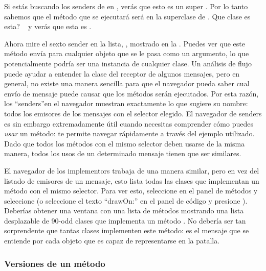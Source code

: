 \documentclass[spanish,a4paper,10pt,twoside]{book}
\begin{document}
Si est\'as buscando los senders de  en , ver\'as que esto es un super .  Por lo tanto sabemos que el m\'etodo que se ejecutar\'a ser\'a en la superclase de  . Que clase es esta?  \Actclick ~  y ver\'as que esta es .

Ahora mire el sexto sender en la lista,  , mostrado en la .
Puedes ver que este m\'etodo env\'ia para cualquier objeto que se le pasa como un argumento, lo que potencialmente podr\'ia ser una instancia de cualquier clase.
Un an\'alisis de flujo puede ayudar a entender la clase del receptor de algunos
mensajes, pero en general, no existe una manera sencilla para que el navegador
pueda saber cual env\'io de mensaje puede causar que los m\'etodos ser\'an
ejecutados. Por esta raz\'on, los ``senders''en el navegador muestran exactamente lo que sugiere su nombre: todos los emisores de los mensajes con el selector elegido. El navegador de senders es sin embargo extremadamente \'util cuando necesitas comprender c\'omo puedes \emph{usar} un m\'etodo: te permite navegar r\'apidamente a trav\'es del ejemplo utilizado. Dado que todos los m\'etodos con el mismo selector deben usarse de la misma manera, todos los usos de un determinado mensaje tienen que ser similares.

El navegador de los implementors trabaja de una manera similar, pero en vez del listado de emisores de un mensaje, esto lista todas las clases que implementan un m\'etodo con el mismo selector. Para ver esto, seleccione  en el panel de m\'etodos y seleccione  (o seleccione el texto ``drawOn:'' en el panel de c\'odigo y presione ).
Deber\'ias obtener una ventana con una lista de m\'etodos mostrando una lista desplazable de 90-odd clases que implementa un m\'etodo .
No deber\'ia ser tan sorprendente que tantas clases implementen este m\'etodo:  es el mensaje que se entiende por cada objeto que es capaz de representarse en la patalla.

\subsubsection{Versiones de un m\'etodo}
\end{document}
